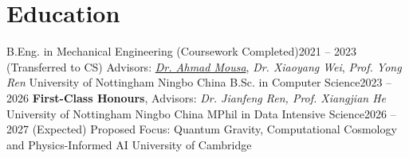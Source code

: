 \section{Education}
\cvEducationListStart

  \cvEducationEntry
    {B.Eng. in Mechanical Engineering (Coursework Completed)}{2021 -- 2023 (Transferred to CS)}
    {\small{Advisors: \href{https://research.nottingham.edu.cn/en/persons/ahmad-mousa}{\textit{Dr. Ahmad Mousa}}, \textit{Dr. Xiaoyang Wei}, \textit{Prof. Yong Ren}}}
    {University of Nottingham Ningbo China}
  \vspace{0.25em}
  \cvEducationEntry
    {B.Sc. in Computer Science}{2023 -- 2026}
    {\textbf{First-Class Honours}, \small{Advisors: \textit{Dr. Jianfeng Ren, Prof. Xiangjian He}}}
    {University of Nottingham Ningbo China}
  \vspace{0.25em}
  \cvEducationEntry
    {MPhil in Data Intensive Science}{2026 – 2027 (Expected)}
    {\small{Proposed Focus: Quantum Gravity, Computational Cosmology and Physics-Informed AI}}
    {University of Cambridge}

\cvEducationListEnd
\vspace{-1mm}%